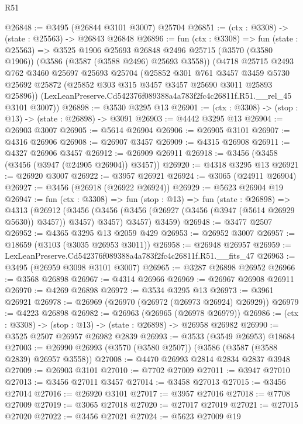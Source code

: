 \begin{lexlean}{R51}
\begin{coremodule}
@26848 := @3495 (@26844 @3101 @3007) @25704
@26851 := (ctx : @3308) -> (state : @25563) -> @26843 @26848
@26896 := fun (ctx : @3308) =>
  fun (state : @25563) =>
  @3525
    @1906
    @25693
    @26848
    @2496
    @25715
    (@3570 (@3580 @1906))
    (@3586 (@3587 (@3588 @2496) @25693 @3558))
    (@4718
      @25715
      @2493
      @762
      @3460
      @25697
      @25693
      @25704
      (@25852
        @301
        @761
        @3457
        @3459
        @5730
        @25692
        @25872
        (@25852 @303 @315 @3457 @3457 @25690 @3011 @25893 @25896))
      (LexLeanPreserve.Cd542376f089388a4a783f2fc4c26811f.R51.__rel_45 @3101 @3007))
@26898 := @3530 @3295 @13
@26901 := (ctx : @3308) -> (stop : @13) -> (state : @26898) -> @3091
@26903 := @4442 @3295 @13
@26904 := @26903 @3007
@26905 := @5614 @26904
@26906 := @26905 @3101
@26907 := @4316 @26906
@26908 := @26907 @3457
@26909 := @4315 @26908
@26911 := @4327 @26906 @3457
@26912 := @26909 @26911
@26918 := @3456 (@3458 (@3456 (@3947 (@24905 @26904)) @3457))
@26920 := @4318 @3295 @13
@26921 := @26920 @3007
@26922 := @3957 @26921
@26924 := @3065 (@24911 @26904)
@26927 := @3456 (@26918 (@26922 @26924))
@26929 := @5623 @26904 @19
@26947 := fun (ctx : @3308) =>
  fun (stop : @13) =>
  fun (state : @26898) =>
  @4313
    (@26912
      (@3456 (@3456 (@3456 (@26927 (@3456 (@3947 (@5614 @26929 @5630)) @3457)) @3457) @3457) @3457)
      @3459)
@26948 := @3477 @2507
@26952 := @4365 @3295 @13 @2059 @429
@26953 := @26952 @3007
@26957 := @18659 (@3103 (@3035 @26953 @3011))
@26958 := @26948 @26957
@26959 := LexLeanPreserve.Cd542376f089388a4a783f2fc4c26811f.R51.__fits_47
@26963 := @3495 (@26959 @3098 @3101 @3007)
@26965 := @3287 @26898 @26952
@26966 := @3568 @26898
@26967 := @4314 @26966
@26969 := @26967 @26908 @26911
@26970 := @4269 @26898
@26972 := @3534 @3295 @13
@26973 := @3961 @26921
@26978 := @26969 (@26970 (@26972 (@26973 @26924) @26929))
@26979 := @4223 @26898
@26982 := @26963 (@26965 (@26978 @26979))
@26986 := (ctx : @3308) -> (stop : @13) -> (state : @26898) -> @26958 @26982
@26990 := @3525 @2507 @26957 @26982 @2839
@26993 := @3533 (@3549 @26953) @18684
@27003 := @26990 @26993 (@3570 (@3580 @2507)) (@3586 (@3587 (@3588 @2839) @26957 @3558))
@27008 := @4470 @26993 @2814 @2834 @2837 @3948
@27009 := @26903 @3101
@27010 := @7702 @27009
@27011 := @3947 @27010
@27013 := @3456 @27011 @3457
@27014 := @3458 @27013
@27015 := @3456 @27014
@27016 := @26920 @3101
@27017 := @3957 @27016
@27018 := @7708 @27009
@27019 := @3065 @27018
@27020 := @27017 @27019
@27021 := @27015 @27020
@27022 := @3456 @27021
@27024 := @5623 @27009 @19

\end{coremodule}
\end{lexlean}
